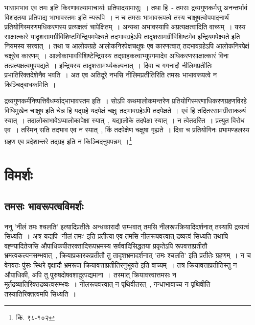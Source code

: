 		भासामभाव एव तमः इति किरणावल्यामाचार्याः प्रतिपादयामासुः~। तथा हि~- तमसः द्रव्यगुणकर्मसु अनन्तर्भावं विशदतया प्रतिपाद्य भाभावस्तमः इति न्यरूपि~। न च तमसः भाभावरूपत्वे तस्य चाक्षुषत्वोपपादनार्थं प्रतियोगिस्मरणमधिकरणस्य प्रत्यक्षत्वं चापेक्षितम्~। अन्यथा अभावस्यापि अप्रत्यक्षत्वादिति वाच्यम्~।‌ यस्य साक्षात्कारे यादृशसामग्रीविशिष्टमिन्द्रियमपेक्ष्यते तदभावग्रहेऽपि तादृशसामग्रीविशिष्टमेव इन्द्रियमपेक्ष्यते इति नियमस्य सत्त्वात्~। तथा च आलोकग्रहे आलोकनिरपेक्षचक्षुषः एव कारणत्वात् तदभावग्रहेऽपि आलोकनिरपेक्षं चक्षुरेव कारणम्~। आलोकाभावविशिष्टेन्द्रियस्य तद्ग्राहकत्वाभ्युपगमादेव अधिकरणसाक्षात्कारं विना तत्प्रत्यक्षत्वमुपपद्यते~। इन्द्रियस्य तादृशसामर्थ्यकल्पनात्~। दिवा च गगनादौ नीलिमप्रतीतिः प्रभातिरिक्तदेशेनैव भवति~। अत एव अतिदूरे नभसि नीलिमप्रतीतिरिति तमसः भाभावरूपत्वे न किञ्चिद्बाधकमिति~।

		{\fontsize{11.7}{0}\selectfont\s  द्रव्यगुणकर्मनिष्पत्तिवैधर्म्याद्भाभावस्तम इति~। सोऽपि कथमालोकमन्तरेण प्रतियोगिस्मरणाधिकरणग्रहणविरहे विधिमुखेन चाक्षुष इति चेन्न हि यद्ग्रहे यदपेक्षं चक्षुः तदभावग्रहेऽपि तदपेक्षते~। एवं हि तदितरसामग्रीसाकल्यं स्यात्~। तदालोकाभावेऽप्यालोकापेक्षा स्यात्~, यद्यालोके तदपेक्षा स्यात्~। न त्वेतदस्ति~। प्रत्युत विरोध एव~। तस्मिन् सति तदभाव एव न स्यात्~, किं तदपेक्षेण चक्षुषा गृह्यते~। दिवा च प्रतियोगिनः प्रभामण्डलस्य ग्रहण एव प्रदेशान्तरे तद्ग्रह इति न किञ्चिदनुपपन्नम्~।\footnote{कि. ९८-१०२}}

	\section{विमर्शः}

		\subsection{तमसः भावरूपत्वविमर्शः}

		ननु 'नीलं तमः श्चलति' इत्यादिप्रतीतेः अन्धकारादौ सम्भवात् तमसि नीलरूपक्रियादिदर्शनात् तस्यापि द्रव्यत्वं सिध्यति~। अत्र यद्यपि 'नीलं तमः' इति प्रतीत्या एव तमसि नीलरूपवत्त्वात् द्रव्यत्वं सिध्यति तथापि वह्न्यादितेजसि औपाधिकपीतरक्तादिरूपभ्रमस्य सर्ववादिसिद्धतया प्रकृतेऽपि रूपवत्ताप्रतीतौ भ्रमत्वकल्पनसम्भवात्~, क्रियाप्रकारकप्रतीतौ तु तादृशभ्रमादर्शनात् 'तमः श्चलति' इति प्रतीतेः ग्रहणम्~। न च वेगवतः पुंसः स्थिरे वृक्षादौ भ्रमरूपा क्रियावत्ताप्रतीतिरनुभूयते इति वाच्यम्~। तत्र क्रियावत्ताप्रतीतिस्तु न औपाधिकी, अपि तु पुरुषदोषवशादुत्पद्यमाना~। तस्मात् क्रियावत्त्वात्तमसः न मूर्तद्रव्यातिरिक्तद्रव्यत्वसम्भवः~। नीलरूपवत्त्वात् न पृथिवीतरत्~, गन्धाभावाच्च न पृथिवीति तस्यातिरिक्तत्वमपि सिध्यति~। 

